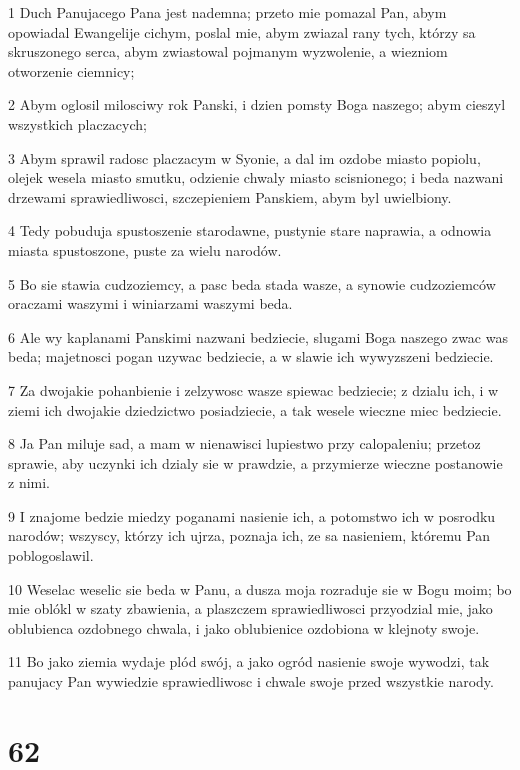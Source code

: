 \par 1 Duch Panujacego Pana jest nademna; przeto mie pomazal Pan, abym opowiadal Ewangelije cichym, poslal mie, abym zwiazal rany tych, którzy sa skruszonego serca, abym zwiastowal pojmanym wyzwolenie, a wiezniom otworzenie ciemnicy;
\par 2 Abym oglosil milosciwy rok Panski, i dzien pomsty Boga naszego; abym cieszyl wszystkich placzacych;
\par 3 Abym sprawil radosc placzacym w Syonie, a dal im ozdobe miasto popiolu, olejek wesela miasto smutku, odzienie chwaly miasto scisnionego; i beda nazwani drzewami sprawiedliwosci, szczepieniem Panskiem, abym byl uwielbiony.
\par 4 Tedy pobuduja spustoszenie starodawne, pustynie stare naprawia, a odnowia miasta spustoszone, puste za wielu narodów.
\par 5 Bo sie stawia cudzoziemcy, a pasc beda stada wasze, a synowie cudzoziemców oraczami waszymi i winiarzami waszymi beda.
\par 6 Ale wy kaplanami Panskimi nazwani bedziecie, slugami Boga naszego zwac was beda; majetnosci pogan uzywac bedziecie, a w slawie ich wywyzszeni bedziecie.
\par 7 Za dwojakie pohanbienie i zelzywosc wasze spiewac bedziecie; z dzialu ich, i w ziemi ich dwojakie dziedzictwo posiadziecie, a tak wesele wieczne miec bedziecie.
\par 8 Ja Pan miluje sad, a mam w nienawisci lupiestwo przy calopaleniu; przetoz sprawie, aby uczynki ich dzialy sie w prawdzie, a przymierze wieczne postanowie z nimi.
\par 9 I znajome bedzie miedzy poganami nasienie ich, a potomstwo ich w posrodku narodów; wszyscy, którzy ich ujrza, poznaja ich, ze sa nasieniem, któremu Pan poblogoslawil.
\par 10 Weselac weselic sie beda w Panu, a dusza moja rozraduje sie w Bogu moim; bo mie oblókl w szaty zbawienia, a plaszczem sprawiedliwosci przyodzial mie, jako oblubienca ozdobnego chwala, i jako oblubienice ozdobiona w klejnoty swoje.
\par 11 Bo jako ziemia wydaje plód swój, a jako ogród nasienie swoje wywodzi, tak panujacy Pan wywiedzie sprawiedliwosc i chwale swoje przed wszystkie narody.

\chapter{62}

